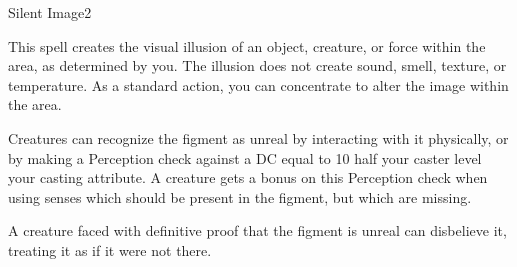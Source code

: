 \begin{spellsection}{Silent Image}{2}
\begin{spellheader}
    \begin{spelltargetinginfo}
    \end{spelltargetinginfo}
\end{spellheader}
\begin{spellcontent}
    \begin{spelleffects}
        \spelleffect This spell creates the visual illusion of an object, creature, or force within the area, as determined by you. The illusion does not create sound, smell, texture, or temperature. As a standard action, you can concentrate to alter the image within the area.
        \spelldur \durshort
    \end{spelleffects}
\end{spellcontent}
\begin{spellfooter}
    \spellnotes Creatures can recognize the figment as unreal by interacting with it physically, or by making a Perception check against a DC equal to 10 \add half your caster level \add your casting attribute. A creature gets a  bonus on this Perception check when using senses which should be present in the figment, but which are missing.

    A creature faced with definitive proof that the figment is unreal can disbelieve it, treating it as if it were not there.
\end{spellfooter}
\end{spellsection}

